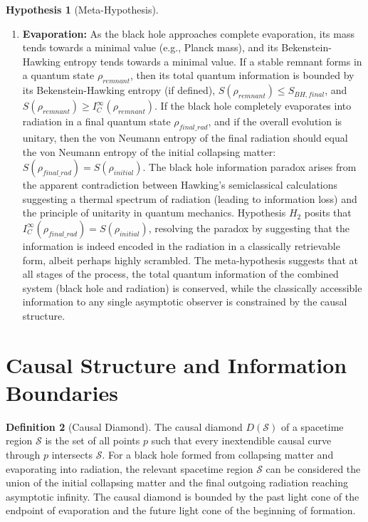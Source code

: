 \documentclass{article}
\theoremstyle{definition}
\newtheorem{definition}{Definition}[section]
\newtheorem{hypothesis}[definition]{Hypothesis}
\begin{document}
\begin{hypothesis}[Meta-Hypothesis]
\begin{enumerate}
			\item \textbf{Evaporation:} As the black hole approaches complete evaporation, its mass tends towards a minimal value (e.g., Planck mass), and its Bekenstein-Hawking entropy tends towards a minimal value. If a stable remnant forms in a quantum state $\rho_{remnant}$, then its total quantum information is bounded by its Bekenstein-Hawking entropy (if defined), $S(\rho_{remnant}) \le S_{BH, final}$, and $S(\rho_{remnant}) \ge I_C^{\infty}(\rho_{remnant})$. If the black hole completely evaporates into radiation in a final quantum state $\rho_{final\_rad}$, and if the overall evolution is unitary, then the von Neumann entropy of the final radiation should equal the von Neumann entropy of the initial collapsing matter: $S(\rho_{final\_rad}) = S(\rho_{initial})$. The black hole information paradox arises from the apparent contradiction between Hawking's semiclassical calculations suggesting a thermal spectrum of radiation (leading to information loss) and the principle of unitarity in quantum mechanics. Hypothesis $H_2$ posits that $I_C^{\infty}(\rho_{final\_rad}) = S(\rho_{initial})$, resolving the paradox by suggesting that the information is indeed encoded in the radiation in a classically retrievable form, albeit perhaps highly scrambled. The meta-hypothesis suggests that at all stages of the process, the total quantum information of the combined system (black hole and radiation) is conserved, while the classically accessible information to any single asymptotic observer is constrained by the causal structure.
		\end{enumerate}
	\end{hypothesis}
	
	\section{Causal Structure and Information Boundaries}
	
	\begin{definition}[Causal Diamond]
		The causal diamond $D(\mathcal{S})$ of a spacetime region $\mathcal{S}$ is the set of all points $p$ such that every inextendible causal curve through $p$ intersects $\mathcal{S}$. For a black hole formed from collapsing matter and evaporating into radiation, the relevant spacetime region $\mathcal{S}$ can be considered the union of the initial collapsing matter and the final outgoing radiation reaching asymptotic infinity. The causal diamond is bounded by the past light cone of the endpoint of evaporation and the future light cone of the beginning of formation.
	\end{definition}
	
\end{document}
